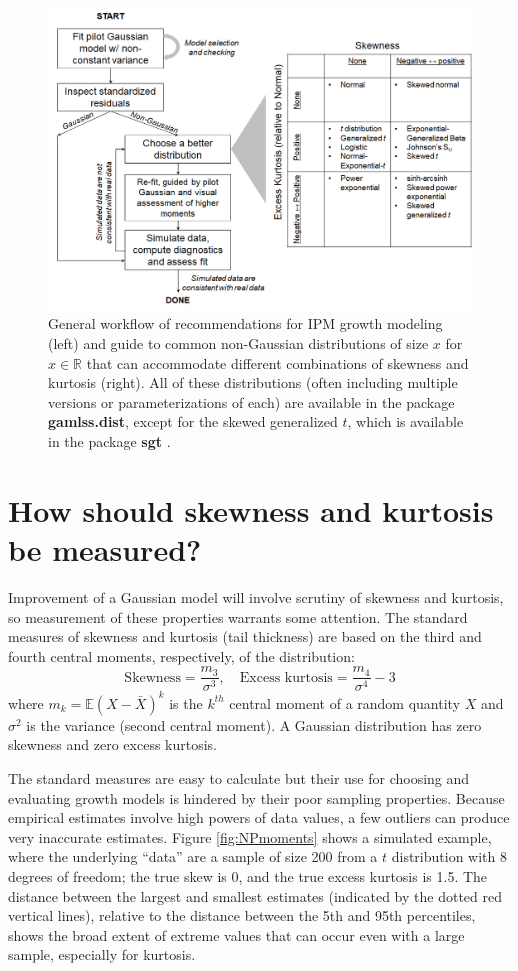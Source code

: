 \documentclass[12pt]{article}
\newcounter{box}
\newcommand{\be}{\begin{equation}}
\newcommand{\ee}{\end{equation}}
\begin{document}
\begin{figure}
\centering
\includegraphics[width=\textwidth]{figures/workflow}
\caption{General workflow of recommendations for IPM growth modeling (left) and guide to common non-Gaussian distributions of size $x$ for $x \in \mathbb{R}$ that can accommodate different combinations of skewness and kurtosis (right). 
All of these distributions (often including multiple versions or parameterizations of each) are available in the package \textbf{gamlss.dist}, 
except for the skewed generalized $t$, which is available in the package \textbf{sgt} \citep{davis-2015}.}
\label{fig:workflow}
\end{figure} 

\section*{How should skewness and kurtosis be measured?}
Improvement of a Gaussian model will involve scrutiny of skewness and kurtosis, so measurement of these properties warrants some attention. 
The standard measures of skewness and kurtosis (tail thickness) are based on the third and fourth central moments, respectively, of the distribution: 
\be
\mbox{Skewness} = \frac{m_3}{\sigma^3}, \quad \mbox{Excess kurtosis} = \frac{m_4}{\sigma^4}-3
\ee
where $m_k = \mathbb{E}(X - \bar{X})^k$ is the $k^{th}$ central moment of a random quantity $X$ 
and $\sigma^2$ is the variance (second central moment). 
A Gaussian distribution has zero skewness and zero excess kurtosis. 

The standard measures are easy to calculate but their use for choosing and evaluating growth models is hindered by their poor sampling properties. 
Because empirical estimates involve high powers of data values, a few outliers can produce very inaccurate estimates. 
Figure \ref{fig:NPmoments} shows a simulated example, where the underlying ``data'' are a sample of size 200 from a $t$ distribution with 
8 degrees of freedom; the true skew is 0, and the true excess kurtosis is 1.5. 
The distance between the largest and smallest estimates (indicated by the dotted red vertical lines), relative to the distance 
between the 5th and 95th percentiles, shows the broad extent of extreme values that can occur even with a large sample, especially for kurtosis. 
\end{document}
